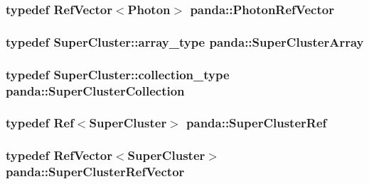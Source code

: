 \hypertarget{namespacepanda_a553f3eb1953907a832ad9cf33d2a0c7b}{
\subsubsection[{PhotonRefVector}]{\setlength{\rightskip}{0pt plus 5cm}typedef {\bf RefVector}$<${\bf Photon}$>$ {\bf panda::PhotonRefVector}}}
\label{namespacepanda_a553f3eb1953907a832ad9cf33d2a0c7b}
\hypertarget{namespacepanda_a1f0062e89c52b348cee00a27920fb35c}{
\subsubsection[{SuperClusterArray}]{\setlength{\rightskip}{0pt plus 5cm}typedef {\bf SuperCluster::array\_\-type} {\bf panda::SuperClusterArray}}}
\label{namespacepanda_a1f0062e89c52b348cee00a27920fb35c}
\hypertarget{namespacepanda_a4821dea82b397c66d9e9d4df54e10eb2}{
\subsubsection[{SuperClusterCollection}]{\setlength{\rightskip}{0pt plus 5cm}typedef {\bf SuperCluster::collection\_\-type} {\bf panda::SuperClusterCollection}}}
\label{namespacepanda_a4821dea82b397c66d9e9d4df54e10eb2}
\hypertarget{namespacepanda_ab1e86cf8d341c37880269572ab447764}{
\subsubsection[{SuperClusterRef}]{\setlength{\rightskip}{0pt plus 5cm}typedef {\bf Ref}$<${\bf SuperCluster}$>$ {\bf panda::SuperClusterRef}}}
\label{namespacepanda_ab1e86cf8d341c37880269572ab447764}
\hypertarget{namespacepanda_aa60eddc3c2149493db37c9984a52395f}{
\subsubsection[{SuperClusterRefVector}]{\setlength{\rightskip}{0pt plus 5cm}typedef {\bf RefVector}$<${\bf SuperCluster}$>$ {\bf panda::SuperClusterRefVector}}}
